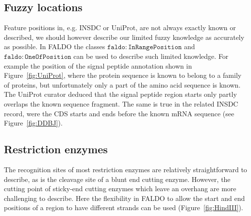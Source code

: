 \subsection*{Fuzzy locations}
Feature positions in, e.g. INSDC or UniProt, are not always exactly known or described, we should however describe our limited fuzzy knowledge as accurately as possible.
In FALDO the classes $\mathtt{faldo\colon{}InRangePosition}$ and $\mathtt{faldo\colon{}OneOfPosition}$ can be used to describe such limited knowledge.
For example the position of the signal peptide annotation shown in Figure~\ref{fig:UniProt}, 
where the protein sequence is known to belong to a family of proteins,
but unfortunately only a part of the amino acid sequence is known. 
The UniProt curator deduced that the signal peptide region starts only partly overlaps the known sequence fragment.
The same is true in the related INSDC record, were the CDS starts and ends before the known mRNA sequence (see Figure~\ref{fig:DDBJ}).

\subsection*{Restriction enzymes}

The recognition sites of most restriction enzymes are relatively
straightforward to describe, as is the cleavage site of a blunt
end cutting enzyme.
However, the cutting point of sticky-end cutting enzymes which
leave an overhang are more challenging to describe. Here the
flexibility in FALDO to allow the start and end positions of a region
to have different strands can be used (Figure~\ref{fig:HindIII}).

